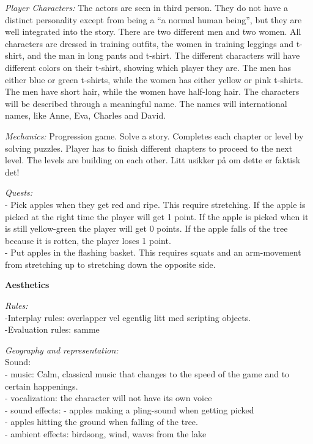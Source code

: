 \emph{Player Characters:} The actors are seen in third person. They do not have a distinct personality except from being a “a normal human being”, but they are well integrated into the story. There are two different men and two women. All characters are dressed in training outfits, the women in training leggings and t-shirt, and the man in long pants and t-shirt. The different characters will have different colors on their t-shirt, showing which player they are. The men has either blue or green t-shirts, while the women has either yellow or pink t-shirts. The men have short hair, while the women have half-long hair. The characters will be described through a meaningful name. The names will international names, like Anne, Eva, Charles and David. 
 
\emph{Mechanics:} Progression game. Solve a story. Completes each chapter or level by solving puzzles. Player has to finish different chapters to proceed to the next level. The levels are building on each other. Litt usikker på om dette er faktisk det!

\emph{Quests:} \\
- Pick apples when they get red and ripe. This require stretching. If the apple is picked at the right time the player will get 1 point. If the apple is picked when it is still yellow-green the player will get 0 points. If the apple falls of the tree because it is rotten, the player loses 1 point. \\ 
- Put apples in the flashing basket. This requires squats and an arm-movement from stretching up to stretching down the opposite side.

\textbf{Aesthetics}

\emph{Rules: } \\
-Interplay rules: overlapper vel egentlig litt med scripting objects. \\
-Evaluation rules: samme 

\emph{Geography and representation:} \\
Sound: \\
- music: Calm, classical music that changes to the speed of the game and to certain happenings. \\
- vocalization: the character will not have its own voice \\
- sound effects: - apples making a pling-sound when getting picked \\
- apples hitting the ground when falling of the tree.  \\
- ambient effects: birdsong, wind, waves from the lake 

